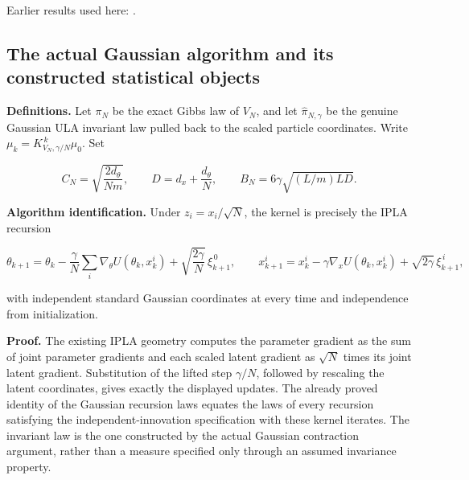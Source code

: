 \documentclass[11pt,a4paper]{report}
\begin{document}
Earlier results used here: \cite[Section~3.1.1]{LangevinLean2026IPLA}.
\subsection{\texorpdfstring{The actual Gaussian algorithm and its constructed statistical objects}{The actual Gaussian algorithm and its constructed statistical objects}}
\label{report-step-WassersteinMixing-IPLA-lean-2}


\textbf{Definitions.} Let \(\pi_N\) be the exact Gibbs law of \(V_N\), and let \(\widehat\pi_{N,\gamma}\) be the genuine Gaussian ULA invariant law pulled back to the scaled particle coordinates. Write \(\mu_k=K_{V_N,\gamma/N}^{\,k}\mu_0\). Set

\[C_N=\sqrt{\frac{2d_\theta}{Nm}},\qquad D=d_x+\frac{d_\theta}{N},\qquad B_N=6\gamma\sqrt{(L/m)LD}.\]


\textbf{Algorithm identification.} Under \(z_i=x_i/\sqrt N\), the kernel is precisely the IPLA recursion

\[\theta_{k+1}=\theta_k-\frac\gamma N\sum_i\nabla_\theta U(\theta_k,x_k^i)+\sqrt{\frac{2\gamma}{N}}\,\xi_{k+1}^{\,0},\qquad x_{k+1}^i=x_k^i-\gamma\nabla_xU(\theta_k,x_k^i)+\sqrt{2\gamma}\,\xi_{k+1}^{\,i},\]


with independent standard Gaussian coordinates at every time and independence from initialization.




\textbf{Proof.} The existing IPLA geometry computes the parameter gradient as the sum of joint parameter gradients and each scaled latent gradient as \(\sqrt N\) times its joint latent gradient. Substitution of the lifted step \(\gamma/N\), followed by rescaling the latent coordinates, gives exactly the displayed updates. The already proved identity of the Gaussian recursion laws equates the laws of every recursion satisfying the independent-innovation specification with these kernel iterates. The invariant law is the one constructed by the actual Gaussian contraction argument, rather than a measure specified only through an assumed invariance property.
\end{document}
